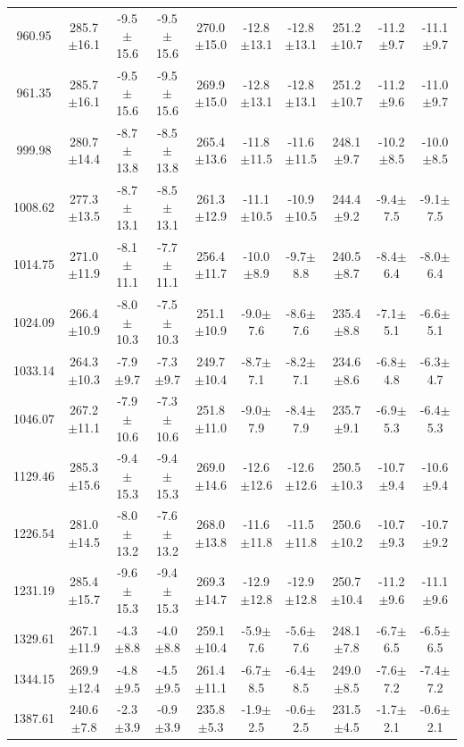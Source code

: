 \documentclass[agupp]{aguplus}              %
\begin{document}
\begin{article}
\begin{center}
\begin{table}[ht]
{\begin{tabular}{c|ccc|ccc|ccc}
960.95 & 285.7$\pm$16.1 & -9.5$\pm$15.6 & -9.5$\pm$15.6 & 270.0$\pm$15.0 & -12.8$\pm$13.1 & -12.8$\pm$13.1 & 251.2$\pm$10.7 & -11.2$\pm$9.7 & -11.1$\pm$9.7 \\ 
961.35 & 285.7$\pm$16.1 & -9.5$\pm$15.6 & -9.5$\pm$15.6 & 269.9$\pm$15.0 & -12.8$\pm$13.1 & -12.8$\pm$13.1 & 251.2$\pm$10.7 & -11.2$\pm$9.6 & -11.0$\pm$9.7 \\ 
\hline
999.98 & 280.7$\pm$14.4 & -8.7$\pm$13.8 & -8.5$\pm$13.8 & 265.4$\pm$13.6 & -11.8$\pm$11.5 & -11.6$\pm$11.5 & 248.1$\pm$9.7 & -10.2$\pm$8.5 & -10.0$\pm$8.5 \\ 
1008.62 & 277.3$\pm$13.5 & -8.7$\pm$13.1 & -8.5$\pm$13.1 & 261.3$\pm$12.9 & -11.1$\pm$10.5 & -10.9$\pm$10.5 & 244.4$\pm$9.2 & -9.4$\pm$7.5 & -9.1$\pm$7.5 \\ 
1014.75 & 271.0$\pm$11.9 & -8.1$\pm$11.1 & -7.7$\pm$11.1 & 256.4$\pm$11.7 & -10.0$\pm$8.9 & -9.7$\pm$8.8 & 240.5$\pm$8.7 & -8.4$\pm$6.4 & -8.0$\pm$6.4 \\ 
1024.09 & 266.4$\pm$10.9 & -8.0$\pm$10.3 & -7.5$\pm$10.3 & 251.1$\pm$10.9 & -9.0$\pm$7.6 & -8.6$\pm$7.6 & 235.4$\pm$8.8 & -7.1$\pm$5.1 & -6.6$\pm$5.1 \\ 
1033.14 & 264.3$\pm$10.3 & -7.9$\pm$9.7 & -7.3$\pm$9.7 & 249.7$\pm$10.4 & -8.7$\pm$7.1 & -8.2$\pm$7.1 & 234.6$\pm$8.6 & -6.8$\pm$4.8 & -6.3$\pm$4.7 \\ 
1046.07 & 267.2$\pm$11.1 & -7.9$\pm$10.6 & -7.3$\pm$10.6 & 251.8$\pm$11.0 & -9.0$\pm$7.9 & -8.4$\pm$7.9 & 235.7$\pm$9.1 & -6.9$\pm$5.3 & -6.4$\pm$5.3 \\ 
\hline
1129.46 & 285.3$\pm$15.6 & -9.4$\pm$15.3 & -9.4$\pm$15.3 & 269.0$\pm$14.6 & -12.6$\pm$12.6 & -12.6$\pm$12.6 & 250.5$\pm$10.3 & -10.7$\pm$9.4 & -10.6$\pm$9.4 \\ 
1226.54 & 281.0$\pm$14.5 & -8.0$\pm$13.2 & -7.6$\pm$13.2 & 268.0$\pm$13.8 & -11.6$\pm$11.8 & -11.5$\pm$11.8 & 250.6$\pm$10.2 & -10.7$\pm$9.3 & -10.7$\pm$9.2 \\ 
1231.19 & 285.4$\pm$15.7 & -9.6$\pm$15.3 & -9.4$\pm$15.3 & 269.3$\pm$14.7 & -12.9$\pm$12.8 & -12.9$\pm$12.8 & 250.7$\pm$10.4 & -11.2$\pm$9.6 & -11.1$\pm$9.6 \\ 
\hline
1329.61 & 267.1$\pm$11.9 & -4.3$\pm$8.8 & -4.0$\pm$8.8 & 259.1$\pm$10.4 & -5.9$\pm$7.6 & -5.6$\pm$7.6 & 248.1$\pm$7.8 & -6.7$\pm$6.5 & -6.5$\pm$6.5 \\ 
1344.15 & 269.9$\pm$12.4 & -4.8$\pm$9.5 & -4.5$\pm$9.5 & 261.4$\pm$11.1 & -6.7$\pm$8.5 & -6.4$\pm$8.5 & 249.0$\pm$8.5 & -7.6$\pm$7.2 & -7.4$\pm$7.2 \\ 
1387.61 & 240.6$\pm$7.8 & -2.3$\pm$3.9 & -0.9$\pm$3.9 & 235.8$\pm$5.3 & -1.9$\pm$2.5 & -0.6$\pm$2.5 & 231.5$\pm$4.5 & -1.7$\pm$2.1 & -0.6$\pm$2.1 \\ 

\end{tabular}}
\end{table}
\end{center}
\end{article}
\end{document}
